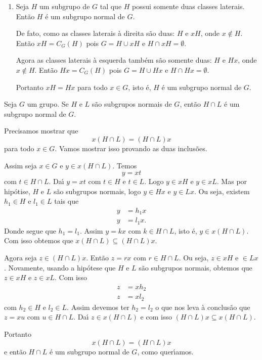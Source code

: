 \begin{exemplos}
\begin{enumerate}[label={\arabic*})]
        \item Seja $H$ um subgrupo de $G$ tal que $H$ possui somente duas classes laterais. Ent\~ao $H$ \'e um subgrupo normal de $G$.
        \begin{solucao}
        	De fato, como as classes laterais \`a direita s\~ao duas: $H$ e $xH$, onde $x \notin H$. Ent\~ao $xH = C_G(H)$ pois $G = H \cup xH$ e $H \cap xH = \emptyset$.

        	Agora as classes laterais \`a esquerda tamb\'em s\~ao somente duas: $H$ e $Hx$, onde $x \notin H$. Ent\~ao $Hx = C_G(H)$ pois $G = H \cup Hx$ e $H \cap Hx = \emptyset$.

        	Portanto $xH = Hx$ para todo $x \in G$, isto \'e, $H$ \'e um subgrupo normal de $G$.
        \end{solucao}
    \end{enumerate}
\end{exemplos}

\begin{proposicao}
    Seja $G$ um grupo. Se $H$ e $L$ s\~ao subgrupos normais de $G$, ent\~ao $H \cap L$ \'e um subgrupo normal de $G$.
\end{proposicao}
\begin{prova}
	Precisamos mostrar que
	\[
		x(H\cap L) = (H \cap L)x
	\]
	para todo $x \in G$. Vamos mostrar isso provando as duas inclus\~oes.

	Assim seja $x \in G$ e $y \in x(H\cap L)$. Temos
	\[
		y = xt
	\]
	com $t \in H\cap L$. Da{\'\i} $y = xt$ com $t \in H$ e $t \in L$. Logo $y \in xH$ e $y \in xL$. Mas por hip\'otise, $H$ e $L$ s\~ao subgrupos normais, logo $y \in Hx$ e $y \in Lx$. Ou seja, existem $h_1 \in H$ e $l_1 \in L$ tais que
	\begin{align*}
		y &= h_1x\\
		y &= l_1x.
	\end{align*}
	Donde segue que $h_1 = l_1$. Assim $y = kx$ com $k \in H\cap L$, isto \'e, $y \in x(H\cap L)$. Com isso obtemos que $x(H\cap L) \subseteq (H\cap L)x$.

	Agora seja $z \in (H\cap L)x$. Ent\~ao $z = rx$ com $r \in H\cap L$. Ou seja, $z \in xH$ e $ \in Lx$. Novamente, usando a hip\'otese que $H$ e $L$ s\~ao subgrupos normais, obtemos que $z \in xH$ e $z \in xL$. Com isso
	\begin{align*}
		z &= xh_2\\
		z &= xl_2
	\end{align*}
	com $h_2 \in H$ e $l_2 \in L$. Assim devemos ter $h_2 = l_2$ o que nos leva \`a conclus\~ao que $z = xu$ com $u \in H\cap L$. Da{\'\i} $z \in x(H \cap L)$ e com isso $(H \cap L)x \subseteq x(H \cap L)$.

	Portanto
	\[
		x(H \cap L) = (H \cap L)x
	\]
	e ent\~ao $H \cap L$ \'e um subgrupo normal de $G$, como quer{\'\i}amos.
\end{prova}

